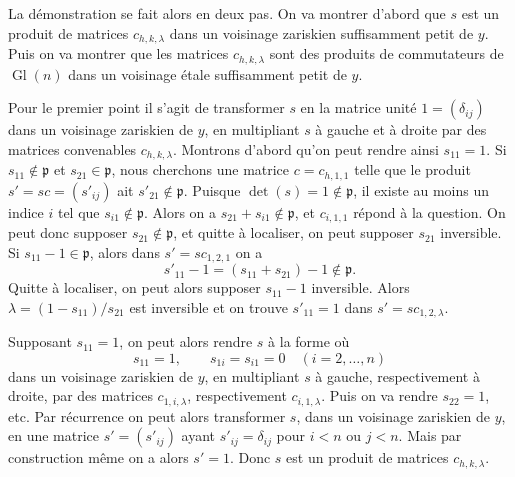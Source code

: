 \documentclass[11pt]{article}
\providecommand{\Gl}{\operatorname{Gl}}
\begin{document}
La démonstration se fait alors en deux pas. On va montrer d'abord que \(s\) est un produit de matrices \(c_{h,k,\lambda}\) dans un voisinage zariskien suffisamment petit de \(y\). Puis on va montrer que les matrices \(c_{h,k,\lambda}\) sont des produits de commutateurs de \(\Gl(n)\) dans un voisinage étale suffisamment petit de \(y\).

Pour le premier point il s'agit de transformer \(s\) en la matrice unité \(1=(\delta_{ij})\) dans un voisinage zariskien de \(y\), en multipliant \(s\) à gauche et à droite par des matrices convenables \(c_{h,k,\lambda}\). Montrons d'abord qu'on peut rendre ainsi \(s_{11}=1\). Si \(s_{11}\notin\mathfrak p\) et \(s_{21}\in\mathfrak p\), nous cherchons une matrice \(c=c_{h,1,1}\) telle que le produit \(s'=sc=(s'_{ij})\) ait \(s'_{21}\notin\mathfrak p\). Puisque \(\det(s)=1\notin\mathfrak p\), il existe au moins un indice \(i\) tel que \(s_{i1}\notin\mathfrak p\). Alors on a \(s_{21}+s_{i1}\notin\mathfrak p\), et \(c_{i,1,1}\) répond à la question. On peut donc supposer \(s_{21}\notin\mathfrak p\), et quitte à localiser, on peut supposer \(s_{21}\) inversible. Si \(s_{11}-1\in\mathfrak p\), alors dans \(s'=sc_{1,2,1}\) on a
\[
 s'_{11}-1=(s_{11}+s_{21})-1\notin\mathfrak p.
\]
Quitte à localiser, on peut alors supposer \(s_{11}-1\) inversible. Alors \(\lambda=(1-s_{11})/s_{21}\) est inversible et on trouve \(s'_{11}=1\) dans \(s'=sc_{1,2,\lambda}\).

Supposant \(s_{11}=1\), on peut alors rendre \(s\) à la forme où
\[
 s_{11}=1,\qquad s_{1i}=s_{i1}=0\quad(i=2,\ldots,n)
\]
dans un voisinage zariskien de \(y\), en multipliant \(s\) à gauche, respectivement à droite, par des matrices \(c_{1,i,\lambda}\), respectivement \(c_{i,1,\lambda}\). Puis on va rendre \(s_{22}=1\), etc. Par récurrence on peut alors transformer \(s\), dans un voisinage zariskien de \(y\), en une matrice \(s'=(s'_{ij})\) ayant \(s'_{ij}=\delta_{ij}\) pour \(i<n\) ou \(j<n\). Mais par construction même on a alors \(s'=1\). Donc \(s\) est un produit de matrices \(c_{h,k,\lambda}\).
\end{document}
